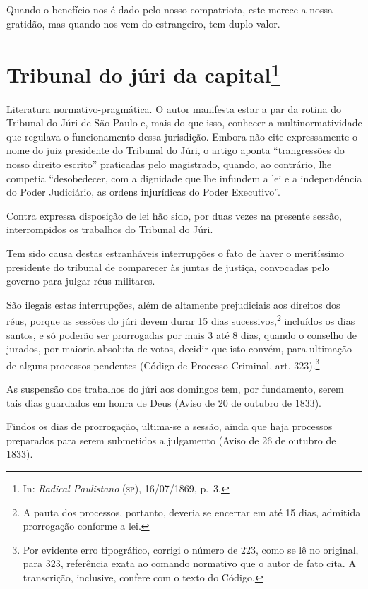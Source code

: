 Quando o benefício nos é dado pelo nosso compatriota, este merece a
nossa gratidão, mas quando nos vem do estrangeiro, tem duplo valor.

\chapter{Tribunal do júri da capital\footnote{In: \emph{Radical Paulistano}
  (\textsc{sp}), 16/07/1869, p.~3.}}

\begin{didascalia}
Literatura normativo-pragmática. O autor manifesta estar a par da rotina
do Tribunal do Júri de São Paulo e, mais do que isso, conhecer a
multinormatividade que regulava o funcionamento dessa jurisdição. Embora
não cite expressamente o nome do juiz presidente do Tribunal do Júri, o
artigo aponta ``trangressões do nosso direito escrito'' praticadas pelo
magistrado, quando, ao contrário, lhe competia ``desobedecer, com a
dignidade que lhe infundem a lei e a independência do Poder Judiciário,
as ordens injurídicas do Poder Executivo''.
\end{didascalia}



Contra expressa disposição de lei hão sido, por duas vezes na presente
sessão, interrompidos os trabalhos do Tribunal do Júri.

Tem sido causa destas estranháveis interrupções o fato de haver o
meritíssimo presidente do tribunal de comparecer às juntas de justiça,
convocadas pelo governo para julgar réus militares.

São ilegais estas interrupções, além de altamente prejudiciais aos
direitos dos réus, porque as sessões do júri devem durar 15 dias
sucessivos,\footnote{A pauta dos processos, portanto, deveria se
  encerrar em até 15 dias, admitida prorrogação conforme a lei.}
incluídos os dias santos, e só poderão ser prorrogadas por mais 3 até 8
dias, quando o conselho de jurados, por maioria absoluta de votos,
decidir que isto convém, para ultimação de alguns processos pendentes
(Código de Processo Criminal, art. 323).\footnote{Por evidente erro
  tipográfico, corrigi o número de 223, como se lê no original, para
  323, referência exata ao comando normativo que o autor de fato cita. A
  transcrição, inclusive, confere com o texto do Código.}

As suspensão dos trabalhos do júri aos domingos tem, por fundamento,
serem tais dias guardados em honra de Deus (Aviso de 20 de outubro de
1833).

Findos os dias de prorrogação, ultima-se a sessão, ainda que haja
processos preparados para serem submetidos a julgamento (Aviso de 26 de
outubro de 1833).

